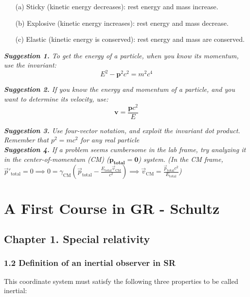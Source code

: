 \documentclass[12pt]{book}
\begin{document}
            \begin{enumerate}
                \item[(a)] Sticky (kinetic energy decreases): rest energy and mass increase.
                \item[(b)] Explosive (kinetic energy increases): rest energy and mass decrease.
                \item[(c)] Elastic (kinetic energy is conserved): rest energy and mass are conserved.
            \end{enumerate}
            
        
        \textit{\textbf{Suggestion 1.} To get the energy of a particle, when you know its momentum, use the invariant:}
        \[
            E^2-\bm{p}^2c^2=m^2c^4    
        \] 
        
        \textit{\textbf{Suggestion 2.} If you know the energy and momentum of a particle, and you want to determine its velocity, use:}
        \[
            \bm{v}=\frac{\bm{p}c^2}{E}
        \]
        
        \textit{\textbf{Suggestion 3.} Use four-vector notation, and exploit the invariant dot product. Remember that \(p^2=mc^2\) for any real particle}\\
        
        \textit{\textbf{Suggestion 4.} If a problem seems cumbersome in the lab frame, try analyzing it in the center-of-momentum (CM) (\(\bm{p_{total}=0}\)) system. (In the CM frame, \( \vec{p}'_{\text{total}} = 0 \implies 0 = \gamma_{\text{CM}} \left( \vec{p}_{\text{total}} - \frac{E_{\text{total}} \vec{v}_{\text{CM}}}{c^2} \right) \implies \vec{v}_{\text{CM}} = \frac{\vec{p}_{\text{total}} c^2}{E_{\text{total}}} \))}


\chapter{A First Course in GR - Schultz}

\section{Chapter 1. Special relativity}
    \subsection{1.2 Definition of an inertial observer in SR}
        This coordinate system must satisfy the following three properties to be called inertial:
\end{document}
